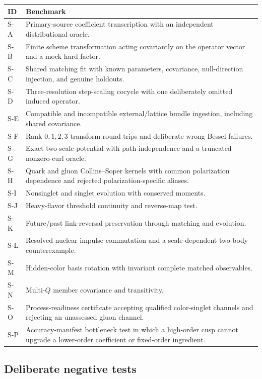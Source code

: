 \documentclass[11pt]{article}
\begin{document}
\begin{longtable}{L{0.12\textwidth}L{0.80\textwidth}}
\toprule
ID & Benchmark\\
\midrule
\endhead
S-A & Primary-source coefficient transcription with an independent distributional oracle.\\
S-B & Finite scheme transformation acting covariantly on the operator vector and a mock hard factor.\\
S-C & Shared matching fit with known parameters, covariance, null-direction injection, and genuine holdouts.\\
S-D & Three-resolution step-scaling cocycle with one deliberately omitted induced operator.\\
S-E & Compatible and incompatible external/lattice bundle ingestion, including shared covariance.\\
S-F & Rank \(0,1,2,3\) transform round trips and deliberate wrong-Bessel failures.\\
S-G & Exact two-scale potential with path independence and a truncated nonzero-curl oracle.\\
S-H & Quark and gluon Collins--Soper kernels with common polarization dependence and rejected polarization-specific aliases.\\
S-I & Nonsinglet and singlet evolution with conserved moments.\\
S-J & Heavy-flavor threshold continuity and reverse-map test.\\
S-K & Future/past link-reversal preservation through matching and evolution.\\
S-L & Resolved nuclear impulse commutation and a scale-dependent two-body counterexample.\\
S-M & Hidden-color basis rotation with invariant complete matched observables.\\
S-N & Multi-\(Q\) member covariance and transitivity.\\
S-O & Process-readiness certificate accepting qualified color-singlet channels and rejecting an unassessed gluon channel.\\
S-P & Accuracy-manifest bottleneck test in which a high-order cusp cannot upgrade a lower-order coefficient or fixed-order ingredient.\\
\bottomrule
\end{longtable}

\subsection{Deliberate negative tests}
\end{document}
